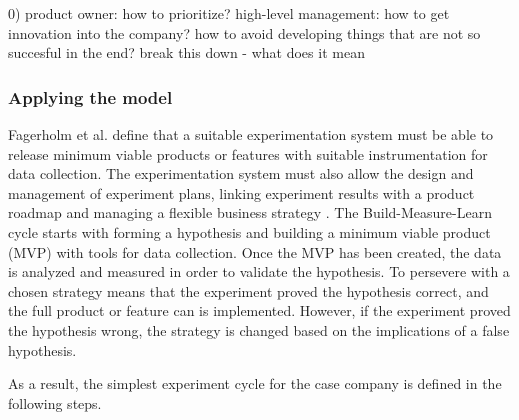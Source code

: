 \documentclass[english]{tktltiki2}
\theoremstyle{definition}
\theoremstyle{remark}
\begin{document}
0)
product owner: how to prioritize?
high-level management: how to get innovation into the company? how to avoid developing things that are not so succesful in the end?
break this down - what does it mean

\subsubsection{Applying the model}
Fagerholm et al. define that a suitable experimentation system must be able to release minimum viable products or features with suitable instrumentation for data collection. The experimentation system must also allow the design and management of experiment plans, linking experiment results with a product roadmap and managing a flexible business strategy \cite{fagerholm2014building}. The Build-Measure-Learn cycle starts with forming a hypothesis and building a minimum viable product (MVP) with tools for data collection. Once the MVP has been created, the data is analyzed and measured in order to validate the hypothesis. To persevere with a chosen strategy means that the experiment proved the hypothesis correct, and the full product or feature can is implemented. However, if the experiment proved the hypothesis wrong, the strategy is changed based on the implications of a false hypothesis.


As a result, the simplest experiment cycle for the case company is defined in the following steps. 

\end{document}

